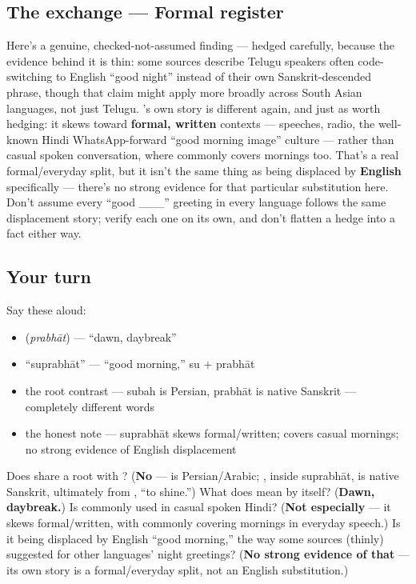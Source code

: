 \subsection*{The exchange — Formal register}
Here's a genuine, checked-not-assumed finding — hedged carefully, because the evidence behind it is thin: some sources describe Telugu speakers often code-switching to English \textquotedblleft{}good night\textquotedblright{} instead of their own Sanskrit-descended phrase, though that claim might apply more broadly across South Asian languages, not just Telugu. 's own story is different again, and just as worth hedging: it skews toward \textbf{formal, written} contexts — speeches, radio, the well-known Hindi WhatsApp-forward \textquotedblleft{}good morning image\textquotedblright{} culture — rather than casual spoken conversation, where \textbf{} commonly covers mornings too. That's a real formal/everyday split, but it isn't the same thing as being displaced by \textbf{English} specifically — there's no strong evidence for that particular substitution here. Don't assume every \textquotedblleft{}good \_\_\_\textquotedblright{} greeting in every language follows the same displacement story; verify each one on its own, and don't flatten a hedge into a fact either way.

\subsection*{Your turn}
Say these aloud:

\begin{itemize}
\raggedright
  \item \textbf{} (\emph{prabhāt}) — \textquotedblleft{}dawn, daybreak\textquotedblright{}
  \item \textquotedblleft{}suprabhāt\textquotedblright{} — \textquotedblleft{}good morning,\textquotedblright{} su + prabhāt
  \item the root contrast — subah is Persian, prabhāt is native Sanskrit — completely different words
  \item the honest note — suprabhāt skews formal/written;  covers casual mornings; no strong evidence of English displacement
\end{itemize}

\begin{tcolorbox}[breakable,colback=teal!4,colframe=teal!35!black,title={Before you move on}]
Does  share a root with ? (\textbf{No} —  is Persian/Arabic; , inside suprabhāt, is native Sanskrit, ultimately from , \textquotedblleft{}to shine.\textquotedblright{}) What does \textbf{} mean by itself? (\textbf{Dawn, daybreak.}) Is  commonly used in casual spoken Hindi? (\textbf{Not especially} — it skews formal/written, with  commonly covering mornings in everyday speech.) Is it being displaced by English \textquotedblleft{}good morning,\textquotedblright{} the way some sources (thinly) suggested for other languages' night greetings? (\textbf{No strong evidence of that} — its own story is a formal/everyday split, not an English substitution.)
\end{tcolorbox}
